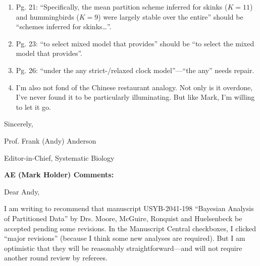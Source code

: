 \documentclass[10pt]{article}
\newcommand{\brmadd}[1]{{\color{blue}{#1}}}
\newcommand{\mrmadd}[1]{{\color{orange}{#1}}}
\begin{document}
\begin{flushleft}
\begin{enumerate}
\medskip
\item{Pg. 21: ``Specifically, the mean partition scheme inferred for skinks ($K = 11$) and hummingbirds ($K = 9$) were largely stable over the entire'' should be ``schemes inferred for skinks…''.}\\
\brmadd{Done.} 

\medskip
\item{Pg. 23: ``to select mixed model that provides'' should be ``to select the mixed model that provides''.}\\
\brmadd{Done.} 

\medskip
\item{Pg. 26: ``under the any strict-/relaxed clock model''---``the any'' needs repair.}\\
\brmadd{Done. Changed text to ``under any strict-/relaxed clock model.''} 

\medskip
\item{I'm also not fond of the Chinese restaurant analogy. Not only is it overdone, I've never found it to be particularly illuminating. But like Mark, I'm willing to let it go.}\\
\brmadd{I agree. Because of its familiarity, it is tempting to draw on the Chinese restaurant metaphor to explain the DPP model. Nevertheless, I've found that it's easy for people to get lost in the metaphor. I've taken your comments as an opportunity to develop a concise (non-metaphorical) description of the DPP for the specific case at hand, including a figure (requested by Reviewer 2) that (I hope) will help readers better grasp the important terms and concepts.} \mrmadd{[BRM: this comment still needs to be addressed.]} 
\end{enumerate}

\bigskip
Sincerely,


\medskip
Prof. Frank (Andy) Anderson

Editor-in-Chief, Systematic Biology


\bigskip
\noindent\makebox[\linewidth]{\rule{6.5in}{0.4pt}}

\textbf{AE (Mark Holder) Comments:}

\bigskip
Dear Andy,

I am writing to recommend that manuscript USYB-2041-198 ``Bayesian Analysis of Partitioned Data'' by Drs. Moore, McGuire, Ronquist and Huelsenbeck be accepted pending some revisions. In the Manuscript Central checkboxes, I clicked ``major revisions'' (because I think some new analyses are required). But I am optimistic that they will be reasonably straightforward---and will not require another round review by referees.


\end{flushleft}
\end{document}
